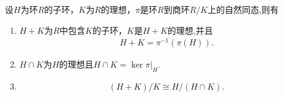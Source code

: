 \documentclass[../../main.tex]{subfiles}%
\begin{document}
\begin{theorem}\label{theorem:抽象代数--定理1.7.6}
设$H$为环$R$的子环，$K$为$R$的理想，$\pi$是环$R$到商环$R/K$上的自然同态,则有
\begin{enumerate}[(1)]
\item\label{theorem:抽象代数--定理1.7.6-1} $H + K$为$R$中包含$K$的子环，$K$是$H+K$的理想,并且
\begin{align*}
H+K=\pi^{-1}(\pi(H)).
\end{align*}

\item\label{theorem:抽象代数--定理1.7.6-2} $H \cap K$为$H$的理想且$H\cap K=\ker \pi|_{H}.$

\item\label{theorem:抽象代数--定理1.7.6-3} \begin{align}
(H + K)/K \cong H/(H \cap K). \label{eq:1ger4wg34wgg54.7.g890u34349n8v4b9}
\end{align}
\end{enumerate}
\end{theorem}
\end{document}
